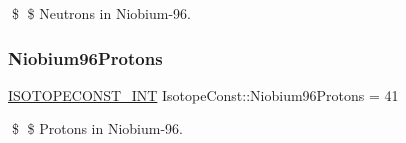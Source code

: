 \$ \$ Neutrons in Niobium-\/96. \mbox{\label{group___isotope_const-_niobium-_nb96_ga7311c4bf45fe135e37ad10cd81cdd8ba}} 
\subsubsection{\texorpdfstring{Niobium96\+Protons}{Niobium96Protons}}
{\footnotesize\ttfamily \mbox{\hyperlink{group___isotope_const-_macros_ga5f18360b3e99483a35c32d789e62621c}{I\+S\+O\+T\+O\+P\+E\+C\+O\+N\+S\+T\+\_\+\+I\+NT}} Isotope\+Const\+::\+Niobium96\+Protons = 41}

\$ \$ Protons in Niobium-\/96. 